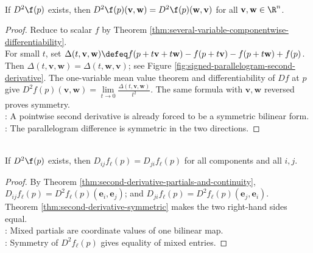 \begin{theorem} \label{thm:second-derivative-symmetric} \\
If $D^2\f(p)$ exists, then $D^2\f(p)(\mathbf{v},\mathbf{w})=D^2\f(p)(\mathbf{w},\mathbf{v})$ for all $\mathbf{v},\mathbf{w}\in\R^n$.
\begin{proof}
Reduce to scalar $f$ by Theorem \ref{thm:several-variable-componentwise-differentiability}.\\
For small $t$, set $\Delta(t,\mathbf{v},\mathbf{w})\defeq f(p+t\mathbf{v}+t\mathbf{w})-f(p+t\mathbf{v})-f(p+t\mathbf{w})+f(p)$.\\
Then $\Delta(t,\mathbf{v},\mathbf{w})=\Delta(t,\mathbf{w},\mathbf{v})$; see Figure \ref{fig:signed-parallelogram-second-derivative}. The one-variable mean value theorem and differentiability of $Df$ at $p$ give $D^2 f(p)(\mathbf{v},\mathbf{w}) =\lim\limits_{t\to0}\frac{\Delta(t,\mathbf{v},\mathbf{w})}{t^2}$. The same formula with $\mathbf{v},\mathbf{w}$ reversed proves symmetry.\\
: A pointwise second derivative is already forced to be a symmetric bilinear form.\\
: The parallelogram difference is symmetric in the two directions.
\end{proof}
\end{theorem}

\begin{corollary} \label{cor:mixed-partials-from-second-derivative} \\
If $D^2\f(p)$ exists, then $D_{ij}f_\ell(p)=D_{ji}f_\ell(p)$ for all components and all $i,j$.
\begin{proof}
By Theorem \ref{thm:second-derivative-partials-and-continuity}, $D_{ij}f_\ell(p)=D^2f_\ell(p)(\mathbf{e}_i,\mathbf{e}_j)$; and $D_{ji}f_\ell(p)=D^2f_\ell(p)(\mathbf{e}_j,\mathbf{e}_i)$.\\
Theorem \ref{thm:second-derivative-symmetric} makes the two right-hand sides equal.\\
: Mixed partials are coordinate values of one bilinear map.\\
: Symmetry of $D^2f_\ell(p)$ gives equality of mixed entries.
\end{proof}
\end{corollary}

